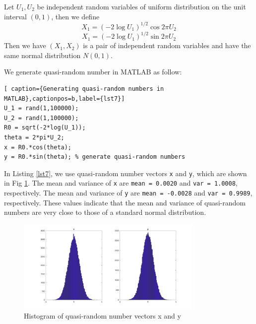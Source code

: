 \documentclass[12pt,a4paper]{article}
\theoremstyle{definition}
\begin{document}
Let $U_1, U_2$ be independent random variables of uniform distribution on the unit interval $(0,1)$, then we define \begin{equation}
    \label{BMx1} X_1=(-2\log U_1)^{1/2}\cos 2\pi U_2
\end{equation}
\begin{equation}
    \label{BMx2} X_1=(-2\log U_1)^{1/2}\sin 2\pi U_2
\end{equation}
Then we have $(X_1, X_2)$ is a pair of independent random variables and have the same normal distribution $N(0,1)$.

We generate quasi-random number in MATLAB as follow:
\begin{lstlisting}[ caption={Generating quasi-random numbers in MATLAB},captionpos=b,label={lst7}]
U_1 = rand(1,100000);
U_2 = rand(1,100000);
R0 = sqrt(-2*log(U_1));
theta = 2*pi*U_2;
x = R0.*cos(theta);
y = R0.*sin(theta); % generate quasi-random numbers
\end{lstlisting}

In Listing \ref{lst7}, we use quasi-random number vectors \verb|x| and \verb|y|, which are shown in Fig \ref{fig14}. The mean and variance of \verb|x| are \verb|mean = 0.0020| and \verb|var = 1.0008|, respectively. The mean and variance of \verb|y| are \verb|mean = -0.0028| and \verb|var = 0.9989|, respectively. These values indicate that the mean and variance of quasi-random numbers are very close to those of a standard normal distribution.

\begin{figure}[htbp]
\centering
\includegraphics[width=0.8\textwidth]{fig/fig14.png}
\caption{\label{fig14} Histogram of quasi-random number vectors x and y}
\end{figure}
\end{document}
